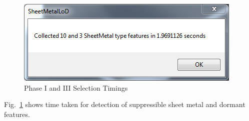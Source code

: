 \begin{figure}[!h]
\centering     %
\includegraphics[width=0.6\linewidth,valign=t]{images/DefeatureSheetMetalTimings}
\caption{Phase I and III Selection Timings}
\label{fig:results:enlosurephItimings}
\end{figure}
Fig.~\ref{fig:results:enlosurephItimings} shows time taken for detection of suppressible sheet metal and dormant features.




